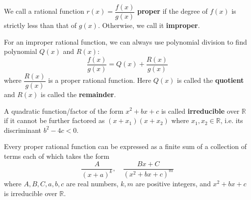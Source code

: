    \begin{definitionenv}
        We call a rational function $r(x)=\dfrac{f(x)}{g(x)}$ \textbf{proper} if the degree of $f(x)$ is strictly less than that of $g(x)$. Otherwise, we call it \textbf{improper}.
    \end{definitionenv}
    \begin{remarkenv}
        For an improper rational function, we can always use polynomial division to find polynomial $Q(x)$ and $R(x)$:
        \[
        \frac{f(x)}{g(x)} = Q(x) + \frac{R(x)}{g(x)}
        \]
        where $\dfrac{R(x)}{g(x)}$ is a proper rational function. Here $Q(x)$ is called the \textbf{quotient} and $R(x)$ is called the \textbf{remainder}.
    \end{remarkenv}
    \begin{definitionenv}
        A quadratic function/factor of the form $x^2+bx+c$ is called \textbf{irreducible} over $\mathbb{R}$ if it cannot be further factored as $(x+x_1)(x+x_2)$ where $x_1,x_2\in \mathbb{R}$, i.e. its discriminant $b^2-4c<0$.
    \end{definitionenv}
    \begin{theoremenv}
        Every proper rational function can be expressed as a finite sum of a collection of terms each of which takes the form
        \[
        \frac{A}{(x+a)^k}, \quad \frac{Bx + C}{(x^2 + bx + c)^m}
        \]
        where $A,B,C,a,b,c$ are real numbers, $k,m$ are positive integers, and $x^2 + bx + c$ is irreducible over $\mathbb{R}$.
    \end{theoremenv}
